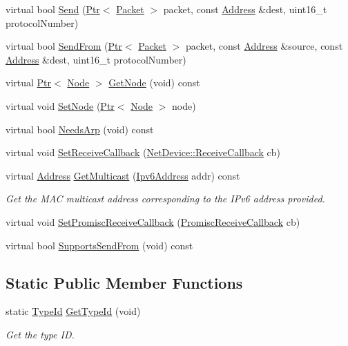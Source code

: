 \begin{DoxyCompactItemize}
virtual bool \hyperlink{classns3_1_1SimpleNetDevice_a06e3ace212b01f6c1fd6ea7ec50ea805}{Send} (\hyperlink{classns3_1_1Ptr}{Ptr}$<$ \hyperlink{classns3_1_1Packet}{Packet} $>$ packet, const \hyperlink{classns3_1_1Address}{Address} \&dest, uint16\+\_\+t protocol\+Number)
\item 
virtual bool \hyperlink{classns3_1_1SimpleNetDevice_a82e090821f8f289e4f226153b6443b57}{Send\+From} (\hyperlink{classns3_1_1Ptr}{Ptr}$<$ \hyperlink{classns3_1_1Packet}{Packet} $>$ packet, const \hyperlink{classns3_1_1Address}{Address} \&source, const \hyperlink{classns3_1_1Address}{Address} \&dest, uint16\+\_\+t protocol\+Number)
\item 
virtual \hyperlink{classns3_1_1Ptr}{Ptr}$<$ \hyperlink{classns3_1_1Node}{Node} $>$ \hyperlink{classns3_1_1SimpleNetDevice_a606cb9d610593669b03efe0f52ff97f1}{Get\+Node} (void) const 
\item 
virtual void \hyperlink{classns3_1_1SimpleNetDevice_a7b0e64c1e4ee9841de0a892db96ddd68}{Set\+Node} (\hyperlink{classns3_1_1Ptr}{Ptr}$<$ \hyperlink{classns3_1_1Node}{Node} $>$ node)
\item 
virtual bool \hyperlink{classns3_1_1SimpleNetDevice_ae21a0688a1aa4145b006754ca38fe3ca}{Needs\+Arp} (void) const 
\item 
virtual void \hyperlink{classns3_1_1SimpleNetDevice_a76c5853338b7adac83c6388a4c0f0258}{Set\+Receive\+Callback} (\hyperlink{classns3_1_1NetDevice_ad5e5e1ca187472bc2ba99575d8def568}{Net\+Device\+::\+Receive\+Callback} cb)
\item 
virtual \hyperlink{classns3_1_1Address}{Address} \hyperlink{classns3_1_1SimpleNetDevice_aa68f34d64eb2bb2c134cc78e8e4fc78e}{Get\+Multicast} (\hyperlink{classns3_1_1Ipv6Address}{Ipv6\+Address} addr) const 
\begin{DoxyCompactList}\small\item\em Get the M\+AC multicast address corresponding to the I\+Pv6 address provided. \end{DoxyCompactList}\item 
virtual void \hyperlink{classns3_1_1SimpleNetDevice_a8a2bb1be033ff108e148582ff0ec6472}{Set\+Promisc\+Receive\+Callback} (\hyperlink{classns3_1_1NetDevice_a427225795919f26c414bee2ea3f31ed2}{Promisc\+Receive\+Callback} cb)
\item 
virtual bool \hyperlink{classns3_1_1SimpleNetDevice_a9a2542634b341889f91c3d1dd35493c4}{Supports\+Send\+From} (void) const 
\end{DoxyCompactItemize}
\subsection*{Static Public Member Functions}
\begin{DoxyCompactItemize}
\item 
static \hyperlink{classns3_1_1TypeId}{Type\+Id} \hyperlink{classns3_1_1SimpleNetDevice_a7408afc44fb59d120b5510882eb70339}{Get\+Type\+Id} (void)
\begin{DoxyCompactList}\small\item\em Get the type ID. \end{DoxyCompactList}\end{DoxyCompactItemize}
